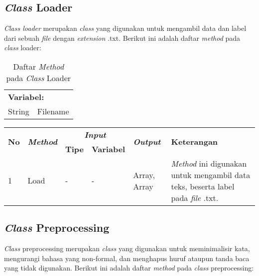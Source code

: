 \subsection{\textit{Class} Loader}
\textit{Class loader} merupakan \textit{class }yang digunakan untuk mengambil data dan label dari sebuah \textit{file }dengan \textit{extension} .txt. Berikut ini adalah daftar \textit{method} pada \textit{class }loader:
\begin{table}[H]
	\caption{Daftar \textit{Method} pada \textit{Class} Loader}
	\centering
	\small
	\begin{adjustbox}{width=1\textwidth}	
	\begin{tabular}{|p{3cm} p{10cm}|}
		\hline
		\multicolumn{2}{|l|}{\textbf{Variabel:}}\\
		String & Filename \\
		\hline
	\end{tabular}
	\end{adjustbox}
\end{table}
\begin{table}[H]
	\centering
	\small
	\begin{adjustbox}{width=1\textwidth}	
	\begin{tabular}{|p{0.4cm}|p{3.2cm}|p{1.4cm}|p{1.7cm}|p{1cm}|p{3.55cm}|}
		\hline
		\multirow{2}{*}{\textbf{No}} & \multirow{2}{*}{\textit{\textbf{Method}}} & \multicolumn{2}{c|}{\textit{\textbf{Input}}} & \multirow{2}{*}{\textit{\textbf{Output}}} & 
		\multirow{2}{*}{\textbf{Keterangan}}\\
		\cline{3-4}
		& & \textbf{Tipe} & \textbf{Variabel} & & \\
		\hline
		1 & Load & - & - & Array, Array & \textit{Method} ini digunakan untuk mengambil data teks, beserta label pada \textit{file} .txt. \\
		\hline
	\end{tabular}
	\end{adjustbox}
\end{table}
\subsection{\textit{Class} Preprocessing}
\textit{Class} preprocessing merupakan \textit{class} yang digunakan untuk meminimalisir kata, mengurangi bahasa yang non-formal, dan menghapus huruf ataupun tanda baca yang tidak digunakan. Berikut ini adalah daftar \textit{method }pada \textit{class} preprocessing:

